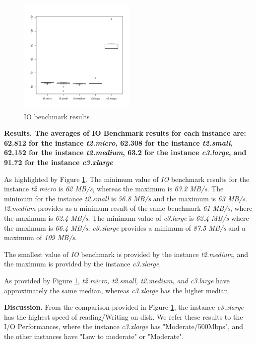 \documentclass[10pt, conference]{IEEEtran}
\begin{document}
\begin{figure}
\includegraphics[width=0.5\textwidth]{plots/dd.pdf}
\caption{IO benchmark results}
\label{fig:ddResult}
\end{figure}

\textbf{Results. The averages of IO Benchmark results for each instance are: 62.812 for the instance \textit{t2.micro}, 62.308 for the instance \textit{t2.small}, 62.152 for the instance \textit{t2.medium}, 63.2 for the instance \textit{c3.large}, and 91.72 for the instance \textit{c3.xlarge}}

As highlighted by Figure \ref{fig:ddResult}. The minimum value of \textit{IO} benchmark results for the instance \textit{t2.micro} is \textit{62 MB/s}, whereas the maximum is \textit{63.2 MB/s}. The minimum for the instance \textit{t2.small} is \textit{56.8 MB/s} and the maximum is \textit{63 MB/s}. \textit{t2.medium} provides as a minimum result of the same benchmark \textit{61 MB/s}, where the maximum is \textit{62.4 MB/s}. The minimum value of \textit{c3.large} is \textit{62.4 MB/s} where the maximum is \textit{66.4 MB/s}. \textit{c3.xlarge} provides a minimum of \textit{87.5 MB/s} and a maximum of \textit{109 MB/s}.

The smallest value of \textit{IO} benchmark is provided by the instance \textit{t2.medium}, and the maximum is provided by the instance \textit{c3.xlarge}.

As provided by Figure \ref{fig:ddResult}, \textit{t2.micro, t2.small, t2.medium, and c3.large} have approximately the same median, whereas \textit{c3.xlarge} has the higher median.


\textbf{Discussion.} From the comparison provided in Figure \ref{fig:ddResult}, the instance \textit{c3.xlarge} has the highest speed of reading/Writing on disk. We refer these results to the I/O Performances, where the instance \textit{c3.xlarge} has "Moderate/500Mbps", and the other instances have "Low to moderate" or "Moderate".
\end{document}
